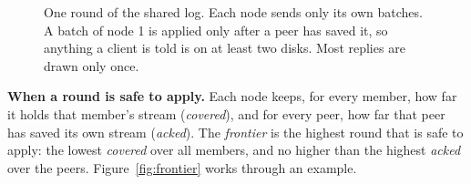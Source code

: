 \begin{figure}[!htb]
\centering
{}
\caption{One round of the shared log. Each node sends only its own batches. A batch of node 1 is applied only after a peer has saved it, so anything a client is told is on at least two disks. Most replies are drawn only once.}
\label{fig:seq-rounds}
\end{figure}

\textbf{When a round is safe to apply.} Each node keeps, for every member, how far it holds that member's stream (\emph{covered}), and for every peer, how far that peer has saved its own stream (\emph{acked}). The \emph{frontier} is the highest round that is safe to apply: the lowest \emph{covered} over all members, and no higher than the highest \emph{acked} over the peers. Figure~\ref{fig:frontier} works through an example.

